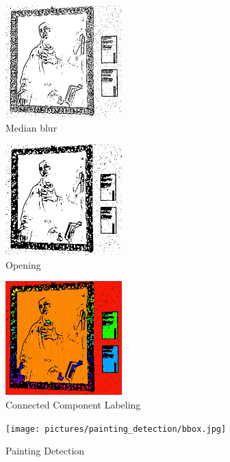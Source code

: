 \begin{figure}[]
    \centering
        \includegraphics[width=0.4\textwidth]{pictures/painting_detection/median_blur.jpg}
    \caption{Median blur}
    \label{fig:c}
\end{figure}

\begin{figure}[]
    \centering
        \includegraphics[width=0.4\textwidth]{pictures/painting_detection/erosion-dilation.jpg}
    \caption{Opening}
    \label{fig:d}
\end{figure}


\begin{figure}[]
    \centering
        \includegraphics[width=0.4\textwidth]{pictures/painting_detection/CCL.jpg}
    \caption{Connected Component Labeling}
    \label{fig:e}
\end{figure}

\begin{figure}[]
    \centering
        \texttt{[image: pictures/painting\_detection/bbox.jpg]}
    \caption{Painting Detection}
    \label{fig:f}
\end{figure}




